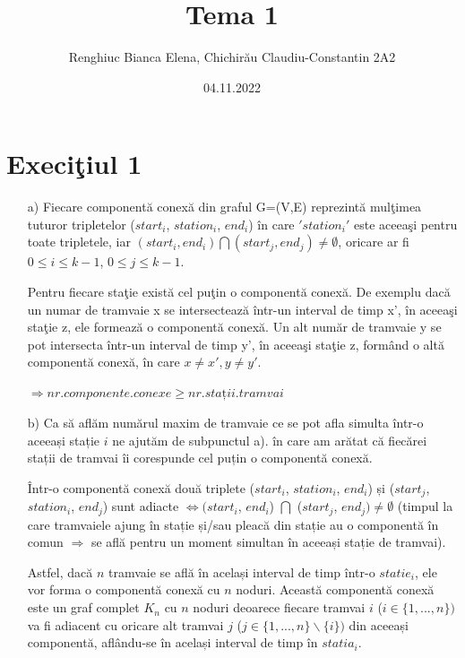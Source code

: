 \documentclass[12pt]{article}
\title{Tema 1}
\author{Renghiuc Bianca Elena, Chichirău Claudiu-Constantin 2A2}
\date{04.11.2022}
\begin{document}
\maketitle

\section{Execi\c{t}iul 1}
  \begin{itemize}
    \item[a)] Fiecare component\u{a} conex\u{a} din graful G=(V,E) reprezint\u{a} mul\c{t}imea tuturor tripletelor ($start_i$, $station_i$, $end_i$)  \^{i}n care $' station_i '$ este aceea\c{s}i pentru toate tripletele, iar $(start_i, end_i) \bigcap (start_j, end_j) \neq \emptyset$, oricare ar fi $0 \leq i \leq k-1$, $0 \leq j \leq k-1$. 
 
    Pentru fiecare sta\c{t}ie exist\u{a} cel pu\c{t}in o component\u{a} conex\u{a}. De exemplu dac\u{a} un numar de tramvaie x se intersecteaz\u{a}  \^{i}ntr-un interval de timp x', \^{i}n aceea\c{s}i sta\c{t}ie z, ele formeaz\u{a} o component\u{a} conex\u{a}. Un alt num\u{a}r de tramvaie y se pot intersecta \^{i}ntr-un interval de timp y', \^{i}n aceea\c{s}i sta\c{t}ie z, form\^{a}nd o alt\u{a} component\u{a} conex\u{a}, \^{i}n care $x \neq x', y \neq y'$.
    
    $\Longrightarrow nr.componente.conexe \geq nr.stații.tramvai$
    \item[b)] 
    Ca să aflăm numărul maxim de tramvaie ce se pot afla simulta într-o aceeași stație $i$ ne ajutăm de subpunctul a). în
	care am arătat că fiecărei stații de tramvai îi corespunde cel puțin o componentă conexă. 

	    Într-o componentă conexă două triplete ($start_i$, $station_i$, $end_i$) și ($start_j$, $station_i$, $end_j$) sunt adiacte $\iff (start_i$, $end_i$) $\bigcap$ ($start_j$, $end_j) \neq \emptyset$ (timpul la care tramvaiele ajung în stație și/sau pleacă 
	din stație au o componentă în comun $\Longrightarrow$ se află pentru un moment simultan în aceeași stație de tramvai). 
	
Astfel, dacă $n$ tramvaie se află în același interval de timp într-o $statie_i$, ele vor forma o componentă conexă cu $n$ noduri. Această componentă conexă este un graf complet $K_n$ cu $n$ noduri deoarece fiecare tramvai $i$ ($i \in \{ 1, ...,n \} )$ va fi adiacent cu oricare alt tramvai $j$ ($j \in \{1, ...,n \} \backslash \{ i \}) $ din aceeași componentă, aflându-se în același interval de timp în $statia_i$. 


\end{itemize}
\end{document}
